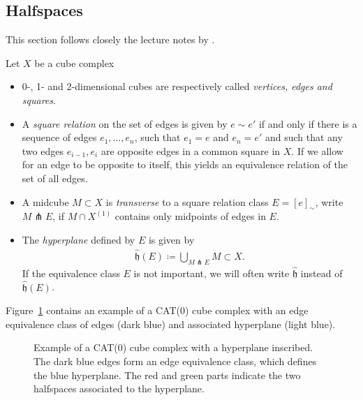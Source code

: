 \subsection{Halfspaces}
\label{sec:halfspaces}

This section follows closely the lecture notes by \textcite{Rolli2012}.

\begin{defin}[Hyperplanes]
  Let \(X\) be a cube complex
  \begin{itemize}
  \item 0-, 1- and 2-dimensional cubes are respectively called \emph{vertices, edges and squares}.
  \item A \emph{square relation} on the set of edges is given by \(e \sim e'\) if and only if there is a sequence of edges \(e_1, \dots, e_n\), such that \(e_1 = e\) and \(e_n = e'\) and such that any two edges \(e_{i-1}, e_i\) are opposite edges in a common square in \(X\). If we allow for an edge to be opposite to itself, this yields an equivalence relation of the set of all edges.
  \item A midcube \(M \subset X\) is \emph{transverse} to a square relation class \(E = [e]_\sim\), write \(M \pitchfork E\), if \(M \cap X^{(1)}\) contains only midpoints of edges in \(E\).
  \item The \emph{hyperplane} defined by \(E\) is given by
    \begin{align*}
      \mathfrak{\hat h}(E) \coloneqq \bigcup_{M \pitchfork E} M \subset X.
    \end{align*}
    If the equivalence class \(E\) is not important, we will often write \(\mathfrak{\hat h}\) instead of \(\mathfrak{\hat h}(E)\).
  \end{itemize}
\end{defin}

\begin{bsp}
  Figure~\ref{fig:hyperplanes} contains an example of a CAT(0) cube complex with an edge equivalence class of edges (dark blue) and associated hyperplane (light blue). 
  \begin{figure}[htbp]
    \centering
    
    \caption{Example of a CAT(0) cube complex with a hyperplane inscribed. The dark blue edges form an edge equivalence class, which defines the blue hyperplane. The red and green parts indicate the two halfspaces associated to the hyperplane.}
    \label{fig:hyperplanes}
  \end{figure}
\end{bsp}


